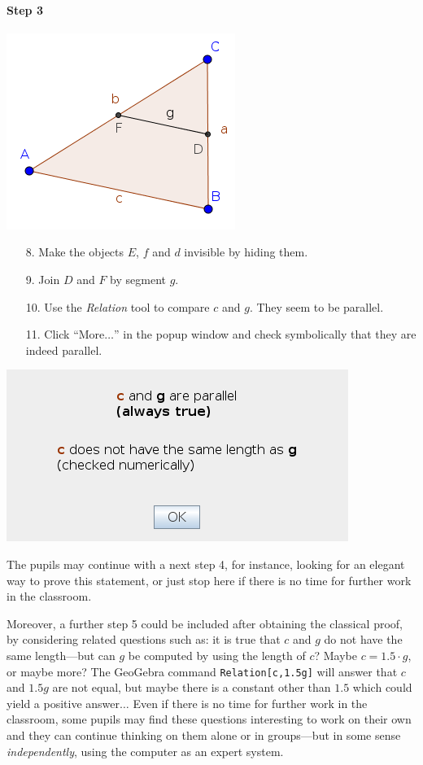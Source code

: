 \documentclass{article}
\begin{document}
\paragraph{Step 3}
\begin{center}
\includegraphics[scale=0.5]{classroom3}
\end{center}
\begin{enumerate}
    \item[8.] Make the objects $E$, $f$ and $d$ invisible by hiding them.
    \item[9.] Join $D$ and $F$ by segment $g$.
    \item[10.] Use the \textit{Relation} tool to compare $c$ and $g$. They seem to be parallel.
    \item[11.] Click ``More$\ldots$'' in the popup window and check symbolically that they are indeed parallel.
\end{enumerate}
\begin{center}
\includegraphics[scale=0.5]{classroom3-Relation}
\end{center}
The pupils may continue with a next step 4, for instance,  looking for an elegant way to prove this statement, or just stop here if there is no time for further work in the classroom.

Moreover, a further step 5 could be included after obtaining the classical proof, by considering related questions such as: it is true that $c$ and $g$ do not have the same length---but can $g$ be computed by using the length of $c$? Maybe $c=1.5\cdot g$, or maybe more? The GeoGebra command \texttt{Relation[c,1.5g]} will  answer that $c$ and $1.5g$ are not equal, but maybe there is a constant other than $1.5$ which could yield a positive answer$\ldots$ Even if there is no time for further work in the classroom, some pupils may find these questions interesting to work on their own and they can continue thinking on them alone or in groups---but in some sense \textit{independently}, using the computer as an expert system.
\end{document}
